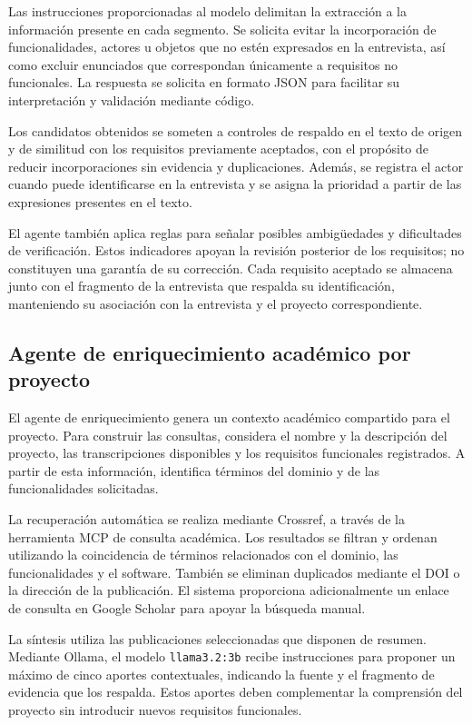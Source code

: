 Las instrucciones proporcionadas al modelo delimitan la
extracción a la información presente en cada segmento.
Se solicita evitar la incorporación de funcionalidades,
actores u objetos que no estén expresados en la entrevista,
así como excluir enunciados que correspondan únicamente
a requisitos no funcionales. La respuesta se solicita
en formato JSON para facilitar su interpretación y
validación mediante código.

Los candidatos obtenidos se someten a controles de respaldo
en el texto de origen y de similitud con los requisitos
previamente aceptados, con el propósito de reducir
incorporaciones sin evidencia y duplicaciones.
Además, se registra el actor cuando puede identificarse
en la entrevista y se asigna la prioridad a partir
de las expresiones presentes en el texto.

El agente también aplica reglas para señalar posibles
ambigüedades y dificultades de verificación. Estos
indicadores apoyan la revisión posterior de los requisitos;
no constituyen una garantía de su corrección. Cada requisito
aceptado se almacena junto con el fragmento de la entrevista
que respalda su identificación, manteniendo su asociación
con la entrevista y el proyecto correspondiente.

\subsection{Agente de enriquecimiento académico por proyecto}


El agente de enriquecimiento genera un contexto académico
compartido para el proyecto. Para construir las consultas,
considera el nombre y la descripción del proyecto, las
transcripciones disponibles y los requisitos funcionales
registrados. A partir de esta información, identifica
términos del dominio y de las funcionalidades solicitadas.

La recuperación automática se realiza mediante Crossref,
a través de la herramienta MCP de consulta académica.
Los resultados se filtran y ordenan utilizando la
coincidencia de términos relacionados con el dominio,
las funcionalidades y el software. También se eliminan
duplicados mediante el DOI o la dirección de la publicación.
El sistema proporciona adicionalmente un enlace de consulta
en Google Scholar para apoyar la búsqueda manual.

La síntesis utiliza las publicaciones seleccionadas que
disponen de resumen. Mediante Ollama, el modelo
\texttt{llama3.2:3b} recibe instrucciones para proponer
un máximo de cinco aportes contextuales, indicando
la fuente y el fragmento de evidencia que los respalda.
Estos aportes deben complementar la comprensión del
proyecto sin introducir nuevos requisitos funcionales.


